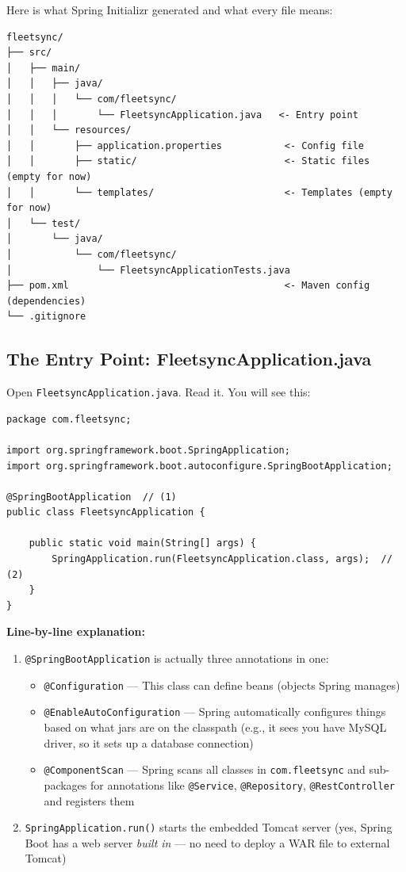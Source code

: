 \documentclass[12pt,a4paper]{report}
\newcommand{\code}[1]{\texttt{\textcolor{keywordblue}{#1}}}
\newcommand{\file}[1]{\texttt{\textcolor{successgreen}{#1}}}
\begin{document}
Here is what Spring Initializr generated and what every file means:

\begin{lstlisting}[style=bashstyle,caption=Project Structure After Generation]
fleetsync/
├── src/
│   ├── main/
│   │   ├── java/
│   │   │   └── com/fleetsync/
│   │   │       └── FleetsyncApplication.java   <- Entry point
│   │   └── resources/
│   │       ├── application.properties           <- Config file
│   │       ├── static/                          <- Static files (empty for now)
│   │       └── templates/                       <- Templates (empty for now)
│   └── test/
│       └── java/
│           └── com/fleetsync/
│               └── FleetsyncApplicationTests.java
├── pom.xml                                      <- Maven config (dependencies)
└── .gitignore
\end{lstlisting}

\subsection{The Entry Point: FleetsyncApplication.java}

\begin{tcolorbox}[handbox]
Open \file{FleetsyncApplication.java}. Read it. You will see this:
\end{tcolorbox}

\begin{lstlisting}[caption=FleetsyncApplication.java -- The Entry Point]
package com.fleetsync;

import org.springframework.boot.SpringApplication;
import org.springframework.boot.autoconfigure.SpringBootApplication;

@SpringBootApplication  // (1)
public class FleetsyncApplication {

    public static void main(String[] args) {
        SpringApplication.run(FleetsyncApplication.class, args);  // (2)
    }
}
\end{lstlisting}

\textbf{Line-by-line explanation:}

\begin{enumerate}
  \item \code{@SpringBootApplication} is actually three annotations in one:
    \begin{itemize}
      \item \code{@Configuration} --- This class can define beans (objects Spring manages)
      \item \code{@EnableAutoConfiguration} --- Spring automatically configures things based on what jars are on the classpath (e.g., it sees you have MySQL driver, so it sets up a database connection)
      \item \code{@ComponentScan} --- Spring scans all classes in \code{com.fleetsync} and sub-packages for annotations like \code{@Service}, \code{@Repository}, \code{@RestController} and registers them
    \end{itemize}
  \item \code{SpringApplication.run()} starts the embedded Tomcat server (yes, Spring Boot has a web server \textit{built in} --- no need to deploy a WAR file to external Tomcat)
\end{enumerate}
\end{document}
